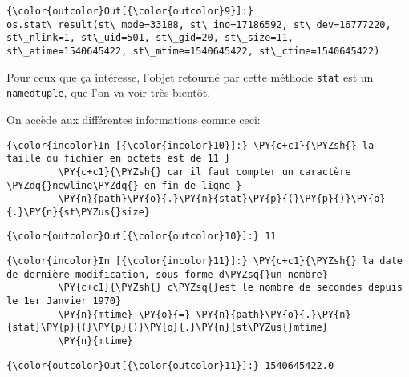 \begin{Verbatim}[commandchars=\\\{\},frame=single,framerule=0.3mm,rulecolor=\color{cellframecolor}]
{\color{outcolor}Out[{\color{outcolor}9}]:} os.stat\_result(st\_mode=33188, st\_ino=17186592, st\_dev=16777220, st\_nlink=1, st\_uid=501, st\_gid=20, st\_size=11, st\_atime=1540645422, st\_mtime=1540645422, st\_ctime=1540645422)
\end{Verbatim}
            
    Pour ceux que ça intéresse, l'objet retourné par cette méthode
\texttt{stat} est un \texttt{namedtuple}, que l'on va voir très bientôt.

On accède aux différentes informations comme ceci:

    \begin{Verbatim}[commandchars=\\\{\},frame=single,framerule=0.3mm,rulecolor=\color{cellframecolor}]
{\color{incolor}In [{\color{incolor}10}]:} \PY{c+c1}{\PYZsh{} la taille du fichier en octets est de 11 }
         \PY{c+c1}{\PYZsh{} car il faut compter un caractère \PYZdq{}newline\PYZdq{} en fin de ligne }
         \PY{n}{path}\PY{o}{.}\PY{n}{stat}\PY{p}{(}\PY{p}{)}\PY{o}{.}\PY{n}{st\PYZus{}size}
\end{Verbatim}


\begin{Verbatim}[commandchars=\\\{\},frame=single,framerule=0.3mm,rulecolor=\color{cellframecolor}]
{\color{outcolor}Out[{\color{outcolor}10}]:} 11
\end{Verbatim}
            
    \begin{Verbatim}[commandchars=\\\{\},frame=single,framerule=0.3mm,rulecolor=\color{cellframecolor}]
{\color{incolor}In [{\color{incolor}11}]:} \PY{c+c1}{\PYZsh{} la date de dernière modification, sous forme d\PYZsq{}un nombre}
         \PY{c+c1}{\PYZsh{} c\PYZsq{}est le nombre de secondes depuis le 1er Janvier 1970}
         \PY{n}{mtime} \PY{o}{=} \PY{n}{path}\PY{o}{.}\PY{n}{stat}\PY{p}{(}\PY{p}{)}\PY{o}{.}\PY{n}{st\PYZus{}mtime}
         \PY{n}{mtime}
\end{Verbatim}


\begin{Verbatim}[commandchars=\\\{\},frame=single,framerule=0.3mm,rulecolor=\color{cellframecolor}]
{\color{outcolor}Out[{\color{outcolor}11}]:} 1540645422.0
\end{Verbatim}
            
